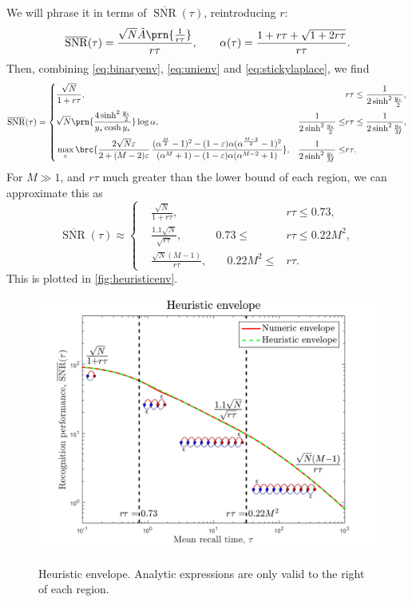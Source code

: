 \documentclass[12pt]{article}
\DeclareMathOperator{\snr}{SNR}
\newcommand{\snrb}{\overline{\snr}}
\begin{document}
We will phrase it in terms of $\snrb(\tau)$, reintroducing $r$:
%
\begin{equation}\label{eq:envunits}
  \snrb(\tau) = \frac{ \sqrt{N} \hat{A}\prn{\frac{1}{r\tau}} }{ r\tau },
  \qquad
  \alpha(\tau) = \frac{ 1 + r\tau +\sqrt{1+2r\tau} }{ r\tau }.
\end{equation}
%
Then, combining \eqref{eq:binaryenv}, \eqref{eq:unienv} and \eqref{eq:stickylaplace}, we find
%
\begin{equation}\label{eq:henv}
  \snrb(\tau) = \left\{
\begin{aligned}
  & \frac{\sqrt{N}}{1+r\tau}, &
  & r\tau \leq \frac{1}{2\sinh^2\frac{y_*}{2}} , \\
  & \sqrt{N}\prn{ \frac{ 4\sinh^2 \frac{y_*}{2} }{ y_* \cosh y_* } } \log\alpha, &
  \frac{1}{2\sinh^2 \frac{y_*}{2}} \leq & r\tau \leq \frac{1}{2\sinh^2 \frac{y_*}{M}} , \\
  & \max_\varepsilon \brc{\frac{2\sqrt{N}\varepsilon}{2+(M-2)\varepsilon} \,
      \frac{ (\alpha^{\frac{M}{2}}-1)^2 - (1-\varepsilon)\alpha(\alpha^{\frac{M-2}{2}}-1)^2 }{ (\alpha^M + 1) - (1-\varepsilon)\alpha(\alpha^{M-2}+1) }}, &
  \frac{1}{2\sinh^2 \frac{y_*}{M}} \leq & r\tau .
\end{aligned}
\right.
\end{equation}
%
For $M \gg 1$, and $r\tau$ much greater than the lower bound of each region, we can approximate this as
%
\begin{equation}\label{eq:henvapproc}
  \snrb(\tau) \approx \left\{
\begin{aligned}
  & \frac{\sqrt{N}}{1+r\tau}, &
  & r\tau \leq 0.73 , \\
  & \frac{ 1.1\sqrt{N}}{ \sqrt{r\tau} } , &
  0.73 \leq & r\tau \leq 0.22 M^2 , \\
  & \frac{ \sqrt{N} (M-1) }{ r\tau }, &\quad
  0.22 M^2 \leq &r\tau .
\end{aligned}
\right.
\end{equation}
%
This is plotted in \autoref{fig:heuristicenv}.



\begin{figure}[tb]
  \centering
  \includegraphics[width=0.8\linewidth]{LenvHeuristic.svg}\\
  \caption[Heuristic envelope]{Heuristic envelope.
  Analytic expressions are only valid to the right of each region.}\label{fig:heuristicenv}
\end{figure}
\end{document}
